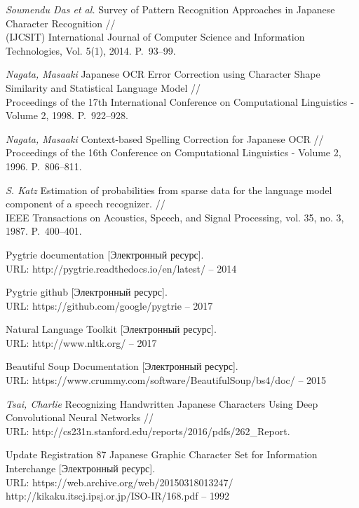 
\begin{thebibliography}{00}
	
\textit{Soumendu Das et al.} Survey of Pattern Recognition Approaches in Japanese Character Recognition //\\
(IJCSIT) International Journal of Computer Science and Information Technologies, Vol. 5(1), 2014. P.~93--99.

\textit{Nagata, Masaaki} Japanese OCR Error Correction using Character Shape Similarity and Statistical Language Model //\\
Proceedings of the 17th International Conference on Computational Linguistics - Volume 2, 1998. P.~922--928.

\textit{Nagata, Masaaki} Context-based Spelling Correction for Japanese OCR //\\
Proceedings of the 16th Conference on Computational Linguistics - Volume 2, 1996. P.~806--811.

\textit{S. Katz} Estimation of probabilities from sparse data for the language model component of a speech recognizer. //\\
IEEE Transactions on Acoustics, Speech, and Signal Processing, vol. 35, no. 3, 1987. P.~400--401.

 Pygtrie documentation [Электронный ресурс]. \\ URL: http://pygtrie.readthedocs.io/en/latest/ -- 2014

 Pygtrie github [Электронный ресурс]. \\ URL: https://github.com/google/pygtrie -- 2017

 Natural Language Toolkit [Электронный ресурс]. \\ URL: http://www.nltk.org/ -- 2017

 Beautiful Soup Documentation [Электронный ресурс]. \\ URL: https://www.crummy.com/software/BeautifulSoup/bs4/doc/ -- 2015

\textit{Tsai, Charlie} Recognizing Handwritten Japanese Characters Using Deep Convolutional Neural Networks //\\
URL: http://cs231n.stanford.edu/reports/2016/pdfs/262\_Report.

Update Registration 87 Japanese Graphic Character Set for Information Interchange [Электронный ресурс]. \\
URL: https://web.archive.org/web/20150318013247/\\http://kikaku.itscj.ipsj.or.jp/ISO-IR/168.pdf -- 1992


\end{thebibliography}
